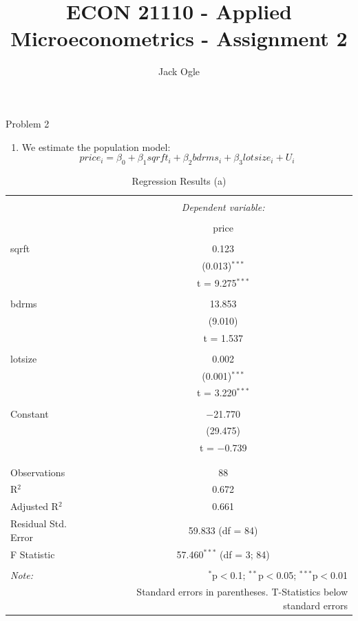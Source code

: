\documentclass[
  12pt,
  landscape]{article}
\title{ECON 21110 - Applied Microeconometrics - Assignment 2}
\author{Jack Ogle}
\date{}
\providecommand{\tightlist}{%
  \setlength{\itemsep}{0pt}\setlength{\parskip}{0pt}}
\begin{document}
\maketitle

Problem 2

\begin{enumerate}
\def\labelenumi{(\alph{enumi})}
\tightlist
\item
  We estimate the population model: \[
  price_i = \beta_0 + \beta_1sqrft_i + \beta_2bdrms_i + \beta_3lotsize_i + U_i
  \]
\end{enumerate}

\begin{table}[!htbp] \centering 
  \caption{Regression Results (a)} 
  \label{} 
\begin{tabular}{@{\extracolsep{5pt}}lc} 
\\[-1.8ex]\hline 
\hline \\[-1.8ex] 
 & \multicolumn{1}{c}{\textit{Dependent variable:}} \\ 
\cline{2-2} 
\\[-1.8ex] & price \\ 
\hline \\[-1.8ex] 
 sqrft & 0.123 \\ 
  & (0.013)$^{***}$ \\ 
  & t = 9.275$^{***}$ \\ 
  & \\ 
 bdrms & 13.853 \\ 
  & (9.010) \\ 
  & t = 1.537 \\ 
  & \\ 
 lotsize & 0.002 \\ 
  & (0.001)$^{***}$ \\ 
  & t = 3.220$^{***}$ \\ 
  & \\ 
 Constant & $-$21.770 \\ 
  & (29.475) \\ 
  & t = $-$0.739 \\ 
  & \\ 
\hline \\[-1.8ex] 
Observations & 88 \\ 
R$^{2}$ & 0.672 \\ 
Adjusted R$^{2}$ & 0.661 \\ 
Residual Std. Error & 59.833 (df = 84) \\ 
F Statistic & 57.460$^{***}$ (df = 3; 84) \\ 
\hline 
\hline \\[-1.8ex] 
\textit{Note:}  & \multicolumn{1}{r}{$^{*}$p$<$0.1; $^{**}$p$<$0.05; $^{***}$p$<$0.01} \\ 
 & \multicolumn{1}{r}{Standard errors in parentheses. T-Statistics below standard errors} \\ 
\end{tabular} 
\end{table}
\end{document}
